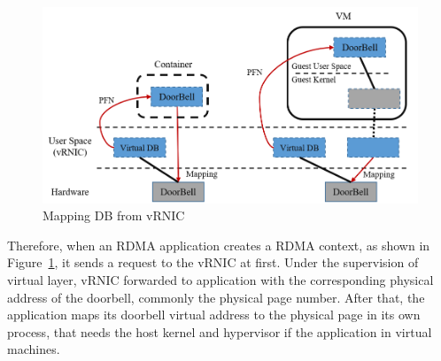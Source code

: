 \begin{figure}[!ht]
	\centering
	\includegraphics[width=1.0\linewidth]{images/by-pass}
	\caption{Mapping DB from vRNIC}
	\label{fig:by-pass}
\end{figure}

Therefore, when an RDMA application creates a RDMA context, as shown in Figure~\ref{fig:by-pass}, it sends a request to the vRNIC at first. Under the supervision of virtual layer, vRNIC forwarded to application with the corresponding physical address of the doorbell, commonly the physical page number. After that, the application maps its doorbell virtual address to the physical page in its own process, that needs the host kernel and hypervisor if the application in virtual machines.

